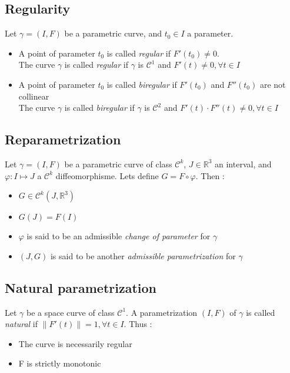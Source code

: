 \subsection{Regularity}
Let $\gamma=(I,F)$ be a parametric \cite{Bloomenthal} curve, and $t_0 \in I$ a parameter.
\begin{itemize}
\item A point of parameter $t_0$ is called \emph{regular} if $F'(t_0) \neq 0$.
\\The curve $\gamma$ is called \emph{regular} if $\gamma$ is $\mathcal{C}^{1}$ and $F'(t) \neq 0, \forall t \in I$
\item A point of parameter $t_0$ is called \emph{biregular} if $F'(t_0)$ and $F''(t_0)$ are not collinear
\\The curve $\gamma$ is called \emph{biregular} if $\gamma$ is $\mathcal{C}^{2}$ and  $F'(t)\cdot    F''(t) \neq 0, \forall t \in I$
\end{itemize}

\subsection{Reparametrization}
Let $\gamma=(I,F)$ be a parametric curve of class ${\mathcal{C}}^{k}$, $J \in {\mathbb{R}}^{3}$ an interval, and $\varphi\colon I\mapsto J$ a ${\mathcal{C}}^{k}$ diffeomorphisme. Lets define $G=F\circ\varphi$. Then :
\begin{itemize}
\item $G\in{\mathcal{C}}^{k}(J,{\mathbb{R}}^3)$
\item $G(J)=F(I)$
\item $\varphi$ is said to be an admissible \emph{change of parameter} for $\gamma$
\item  $(J,G)$ is said to be another \emph{admissible parametrization} for $\gamma$
\end{itemize}

\subsection{Natural parametrization}
Let $\gamma$ be a space curve of class ${\mathcal{C}}^{1}$. A parametrization $(I,F)$ of $\gamma$ is called \emph{natural} if $\|F'(t)\| = 1, \forall t \in I$. Thus : 
\begin{itemize}
\item The curve is necessarily regular
\item F is strictly monotonic
\end{itemize}

